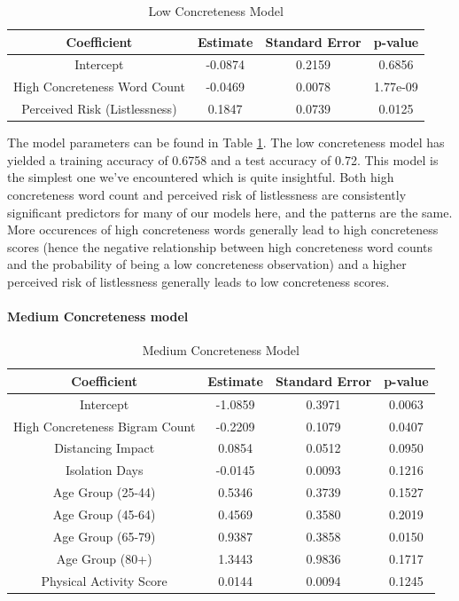 \documentclass[12pt, a4paper]{article}
\begin{document}
\begin{table}[ht]
\centering
\begin{tabular}{||c c c c||} 
 \hline
 Coefficient & Estimate & Standard Error & p-value \\ [0.5ex] 
 \hline\hline
 Intercept & -0.0874 & 0.2159 & 0.6856 \\ 
 High Concreteness Word Count & -0.0469 & 0.0078 & 1.77e-09 \\
 Perceived Risk (Listlessness)  & 0.1847 & 0.0739 & 0.0125 \\ [1ex] 
 \hline
\end{tabular}
\caption{Low Concreteness Model}
\label{table:low}
\end{table}

The model parameters can be found in Table \ref{table:low}. The low concreteness model has yielded a training accuracy of 0.6758 and a test accuracy of 0.72. This model is the simplest one we've encountered which is quite insightful. Both high concreteness word count and perceived risk of listlessness are consistently significant predictors for many of our models here, and the patterns are the same. More occurences of high concreteness words generally lead to high concreteness scores (hence the negative relationship between high concreteness word counts and the probability of being a low concreteness observation) and a higher perceived risk of listlessness generally leads to low concreteness scores.

\paragraph{Medium Concreteness model}

\begin{table}[ht]
\centering
\begin{tabular}{||c c c c||} 
 \hline
 Coefficient & Estimate & Standard Error & p-value \\ [0.5ex] 
 \hline\hline
 Intercept & -1.0859 & 0.3971 & 0.0063 \\ 
 High Concreteness Bigram Count & -0.2209 & 0.1079 & 0.0407 \\
 Distancing Impact  & 0.0854 & 0.0512 & 0.0950 \\ 
 Isolation Days & -0.0145 & 0.0093 & 0.1216 \\ 
 Age Group (25-44)  & 0.5346 & 0.3739 & 0.1527 \\ 
 Age Group (45-64)  & 0.4569 & 0.3580 & 0.2019 \\
 Age Group (65-79)  & 0.9387 & 0.3858 & 0.0150 \\
 Age Group (80+)  & 1.3443 & 0.9836 & 0.1717 \\
 Physical Activity Score  & 0.0144 & 0.0094 & 0.1245 \\ [1ex] 
 \hline
\end{tabular}
\caption{Medium Concreteness Model}
\label{table:medium}
\end{table}
\end{document}
